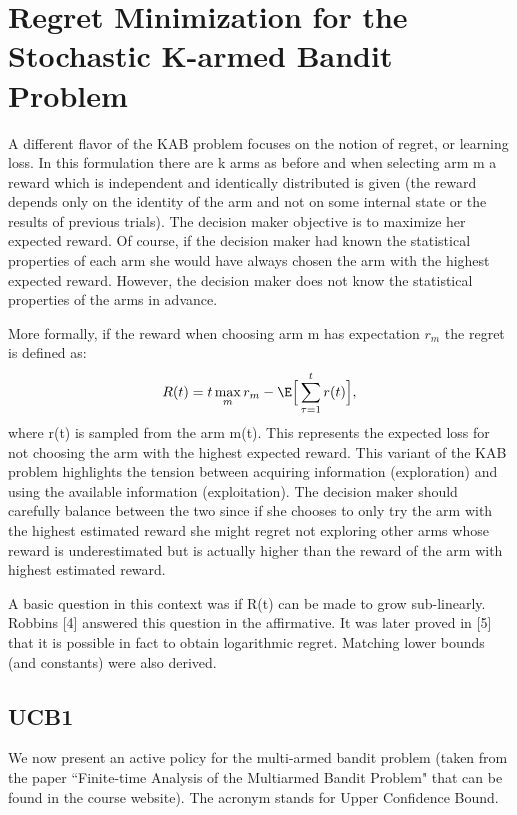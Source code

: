 
\section{Regret Minimization for the Stochastic K-armed Bandit Problem}

A different flavor of the KAB problem focuses on the notion of regret, or learning loss. In this formulation there are k arms as before and when selecting arm m a reward which is independent and identically distributed is given (the reward depends only on the identity of the arm and not on some internal state or the results of previous trials). The decision maker objective is to maximize her expected reward. Of course, if the decision maker had known the statistical properties of each arm she would have always chosen the arm with the highest expected reward. However, the decision maker does not know the statistical properties of the arms in advance.

More formally, if the reward when choosing arm m has expectation $r_m$ the regret is defined as:
$$
R(t) = t \max_m r_m - \E \Big[ \sum_{\tau=1}^t r(t) \Big],
$$
where r(t) is sampled from the arm m(t). This represents the expected loss for not choosing the arm with the highest expected reward.
This variant of the KAB problem highlights the tension between acquiring information (exploration) and using the available information (exploitation). The decision maker should carefully balance between the two since if she chooses to only try the arm with the highest estimated reward she might regret not exploring other arms whose reward is underestimated but is actually higher than the reward of the arm with highest estimated reward.

A basic question in this context was if R(t) can be made to grow sub-linearly. Robbins [4] answered this question in the affirmative. It was later proved in [5] that it is possible in fact to obtain logarithmic regret. Matching lower bounds (and constants) were also derived.


\subsection{UCB1}
We now present an active policy for the multi-armed bandit
problem (taken from the paper ``Finite-time Analysis of the Multiarmed Bandit
Problem" that can be found in the course website).
The acronym stands for Upper Confidence Bound.

